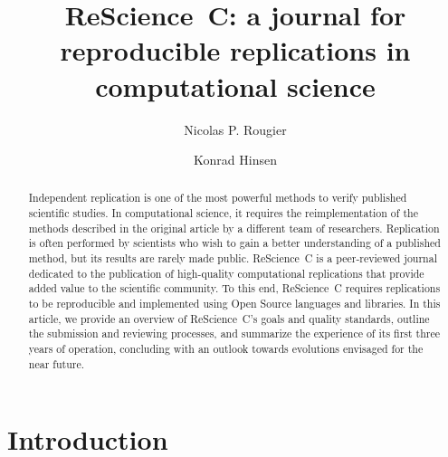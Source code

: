 \documentclass[runningheads]{llncs}
\begin{document}
%
\title{ReScience~C: a journal for reproducible replications in computational science}
%

\author{Nicolas P. Rougier \and
Konrad Hinsen}
%
%
%
\maketitle              %
%
\begin{abstract}
  Independent replication is one of the most powerful methods to
  verify published scientific studies.  In computational science, it
  requires the reimplementation of the methods described in the
  original article by a different team of researchers.  Replication is
  often performed by scientists who wish to gain a better
  understanding of a published method, but its results are rarely made
  public. ReScience~C is a peer-reviewed journal dedicated to the
  publication of high-quality computational replications that provide
  added value to the scientific community.  To this end, ReScience~C
  requires replications to be reproducible and implemented using Open
  Source languages and libraries. In this article, we provide an
  overview of ReScience~C's goals and quality standards, outline the
  submission and reviewing processes, and summarize the experience of
  its first three years of operation, concluding with an outlook
  towards evolutions envisaged for the near future.

\end{abstract}
%
\section{Introduction}
\end{document}
